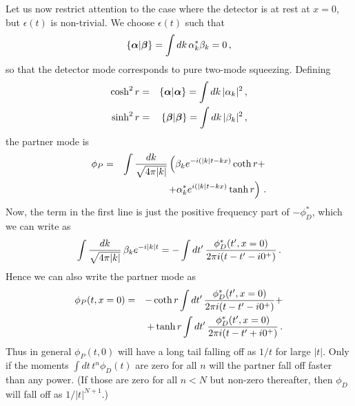 \documentclass[aps,prd,showpacs,amssymb,nofootinbib,twocolumn]{revtex4}
\newcommand{\scalar}[2]{\left\{#1|#2\right\}}
\newcommand{\nn}{\nonumber\\}
\newcommand{\f}[1]{\mbox{\boldmath$#1$}}
\newcommand{\bea}{\begin{eqnarray}}
\newcommand{\ea}{\end{eqnarray}}
\newcommand{\eea}{\end{eqnarray}}
\begin{document}
Let us now restrict attention to the case where the detector is at rest at 
$x=0$, but $\epsilon(t)$ is non-trivial.
%
We choose $\epsilon(t)$ such that 
%
\bea
\scalar{\f{\alpha}}{\f{\beta}}=\int dk\,\alpha^*_{k}\beta_{k}=0
\,,
\ea
%
so that the detector mode corresponds to pure two-mode squeezing. 
%
Defining
%
\bea
\cosh^2r &=& \scalar{\f{\alpha}}{\f{\alpha}} = \int dk\, |\alpha_k|^2 
\,,
\nn
\sinh^2r &=& \scalar{\f{\beta}}{\f{\beta}} = \int dk\, |\beta_k|^2
\,,
\eea
%
the partner mode is
%
\bea
\phi_P 
&=& 
\int {dk\over\sqrt{4\pi|k|}}
\left(
\beta_k e^{-i(|k|t-kx)}\coth r 
+
\right.
\nn
&&
\left.
+
\alpha^*_k e^{i(|k|t-kx)}\tanh r
\right) 
\,.
\eea
%
Now, the term in the first line is just the positive frequency part of 
$-\phi_D^*$, which we can write as 
%
\bea
\int{dk\over\sqrt{4\pi|k|}}\,\beta_k e^{-i|k|t} 
= 
-\int dt'\,
{\phi_D^*(t',x=0)\over 2\pi i(t-t'-i0^+)}
\,.
\eea
%
Hence we can also write the partner mode as
%
\bea
\phi_P(t,x=0)
&=&  
-\coth r
\int dt'\,{\phi_D^*(t',x=0)\over 2\pi i(t-t'-i0^+)}+
\nn
&&
+\tanh r
\int dt'\,{\phi_D^*(t',x=0)\over 2\pi i( t-t'+i0^+)} 
\,. 
\eea
%
Thus in general $\phi_P(t,0)$ will have a long tail falling off as 
$1/t$ for large $|t|$. 
%
Only if the moments $\int dt\,t^n \phi_D(t)$ are zero for all $n$ will the
partner fall off faster than any power. 
%
(If those are zero for all $n<N$ but non-zero thereafter, then $\phi_D$ 
will fall off as $1/|t|^{N+1}$.)
\end{document}
